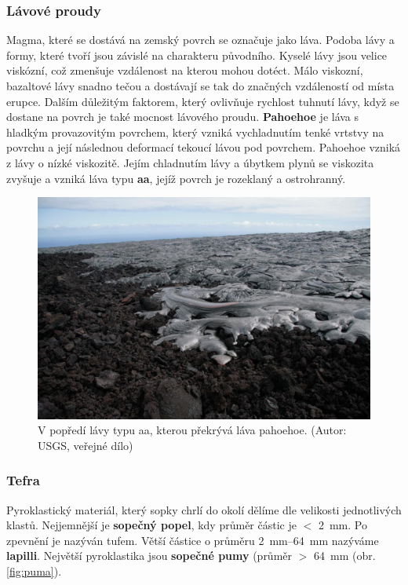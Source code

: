 \subsubsection{Lávové proudy}
Magma, které se dostává na zemský povrch se označuje jako láva. Podoba lávy a formy, které tvoří jsou závislé na charakteru původního. Kyselé lávy jsou velice viskózní, což zmenšuje vzdálenost na kterou mohou dotéct. Málo viskozní, bazaltové lávy snadno tečou a dostávají se tak do značných vzdáleností od místa erupce. Dalším důležitým faktorem, který ovlivňuje rychlost tuhnutí lávy, když se dostane na povrch je také mocnost lávového proudu. 
\textbf{Pahoehoe} je láva s hladkým provazovitým povrchem, který vzniká vychladnutím tenké vrtstvy na povrchu a její následnou deformací tekoucí lávou pod povrchem. Pahoehoe vzniká z lávy o nízké viskozitě. Jejím chladnutím lávy a úbytkem plynů se viskozita zvyšuje a vzniká láva typu \textbf{aa}, jejíž povrch je rozeklaný a ostrohranný.


\begin{figure}[h]
	\includegraphics[width=\linewidth]{obrazky/sopky/paho_aa}
	\caption[Pahoehoe]{V popředí lávy typu aa, kterou překrývá láva pahoehoe. (Autor: USGS, veřejné dílo)}
	\label{fig:pahoe_aa}
\end{figure}

\subsubsection{Tefra}
Pyroklastický materiál, který sopky chrlí do okolí dělíme dle velikosti jednotlivých klastů. Nejjemnější je \textbf{sopečný popel}, kdy průměr částic je $<$ \SI{2}{\milli\metre}. Po zpevnění je nazýván tufem. Větší částice o průměru \SIrange{2}{64}{\milli\metre} nazýváme \textbf{lapilli}. Největší pyroklastika jsou \textbf{sopečné pumy} (průměr $>$ \SI{64}{\milli\metre} (obr. \ref{fig:puma}).

